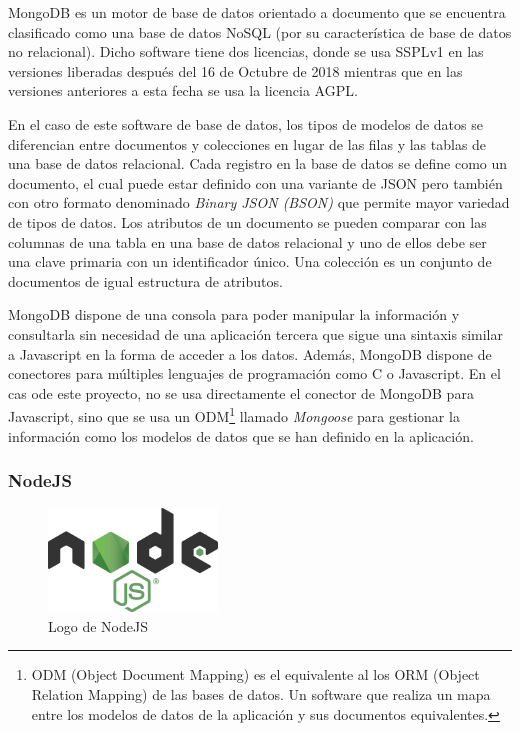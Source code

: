 \documentclass[spanish,12pt, a4paper, twoside]{paper}
\begin{document}
MongoDB es un motor de base de datos orientado a documento que se encuentra clasificado como una base de datos NoSQL (por su característica de base de datos no relacional). Dicho software tiene dos licencias, donde se usa SSPLv1 en las versiones liberadas después del 16 de Octubre de 2018 mientras que en las versiones anteriores a esta fecha se usa la licencia AGPL.
\newline

En el caso de este software de base de datos, los tipos de modelos de datos se diferencian entre documentos y colecciones en lugar de las filas y las tablas de una base de datos relacional. Cada registro en la base de datos se define como un documento, el cual puede estar definido con una variante de JSON pero también con otro formato denominado \emph{Binary JSON (BSON)} que permite mayor variedad de tipos de datos.
Los atributos de un documento se pueden comparar con las columnas de una tabla en una base de datos relacional y uno de ellos debe ser una clave primaria con un identificador único. Una colección es un conjunto de documentos de igual estructura de atributos.
\newline

MongoDB dispone de una consola para poder manipular la información y consultarla sin necesidad de una aplicación tercera que sigue una sintaxis similar a Javascript en la forma de acceder a los datos.
Además, MongoDB dispone de conectores para múltiples lenguajes de programación como C o Javascript. En el cas ode este proyecto, no se usa directamente el conector de MongoDB para Javascript, sino que se usa un ODM\footnote{ODM (Object Document Mapping) es el equivalente al los ORM (Object Relation Mapping) de las bases de datos. Un software que realiza un mapa entre los modelos de datos de la aplicación y sus documentos equivalentes.} llamado \emph{Mongoose} para gestionar la información como los modelos de datos que se han definido en la aplicación.

\subsubsection{NodeJS}

\begin{figure}
\centering
	\includegraphics[width=0.40\textwidth]{recursos/nodejslogo}
\caption{Logo de NodeJS}
\label{fig:Logo de NodeJS}
\end{figure}
\end{document}
